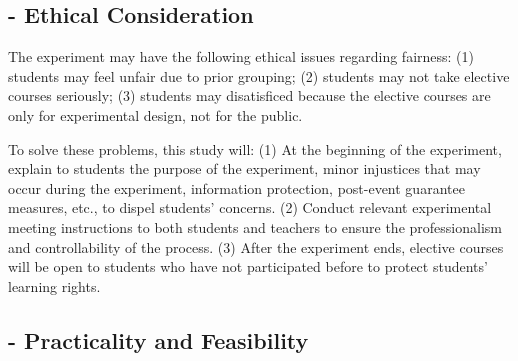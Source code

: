 \documentclass[12pt]{article} %
\begin{document}
\subsection*{- Ethical Consideration}

\vspace{.3cm}

\noindent The experiment may have the following ethical issues regarding fairness: (1) students may feel unfair due to prior grouping; (2) students may not take elective courses seriously; (3) students may disatisficed because the elective courses are only for experimental design, not for the public.

\noindent To solve these problems, this study will: (1) At the beginning of the experiment, explain to students the purpose of the experiment, minor injustices that may occur during the experiment, information protection, post-event guarantee measures, etc., to dispel students' concerns. (2) Conduct relevant experimental meeting instructions to both students and teachers to ensure the professionalism and controllability of the process. (3) After the experiment ends, elective courses will be open to students who have not participated before to protect students' learning rights.

\subsection*{- Practicality and Feasibility}
\end{document}
